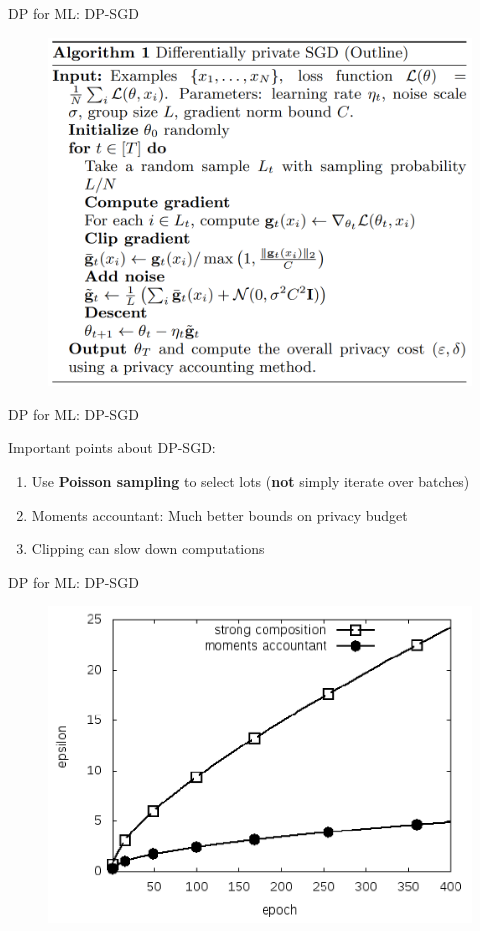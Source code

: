 \documentclass[12pt,aspectratio=169]{beamer}
\begin{document}
\begin{frame}{DP for ML: DP-SGD}

\begin{figure}
    \centering
    \includegraphics[width=0.6\linewidth]{figures/abadi-algo.PNG}
\end{figure}

\end{frame}


\begin{frame}{DP for ML: DP-SGD}

Important points about DP-SGD:
\begin{enumerate}
    \item Use \textbf{Poisson sampling} to select lots (\textbf{not} simply iterate over batches)
    \item Moments accountant: Much better bounds on privacy budget
    \item Clipping can slow down computations
\end{enumerate}

\end{frame}

\begin{frame}{DP for ML: DP-SGD}

\begin{figure}
    \centering
    \includegraphics[width=0.6\linewidth]{figures/moments-accountant.PNG}
    \caption{\citet{Abadi.et.al.2016.SIGSAC}}
\end{figure}

\end{frame}
\end{document}
